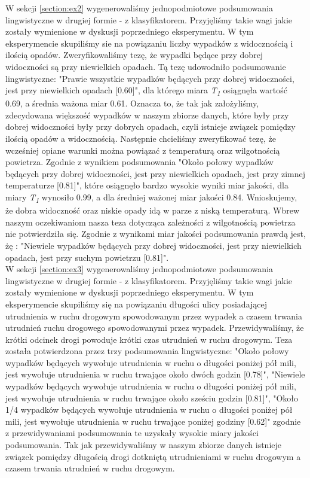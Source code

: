 \documentclass{classrep}
\begin{document}
W sekcji \ref{section:ex2} wygenerowaliśmy jednopodmiotowe podsumowania lingwistyczne w drugiej formie - z klasyfikatorem. Przyjęliśmy takie wagi jakie zostały wymienione w dyskusji poprzedniego eksperymentu. W tym eksperymencie skupiliśmy sie na powiązaniu liczby wypadków z widocznością i ilością opadów. Zweryfikowaliśmy tezę, że wypadki będące przy dobrej widoczności są przy niewielkich opadach. Tą tezę udowodniło podsumowanie lingwistyczne: "Prawie wszystkie wypadków będących przy dobrej widoczności, jest przy niewielkich opadach [0.60]", dla którego miara \textit{T\textsubscript{1}} osiągnęła wartość 0.69, a średnia ważona miar 0.61. Oznacza to, że tak jak założyliśmy, zdecydowana większość wypadków w naszym zbiorze danych, które były przy dobrej widoczności były przy dobrych opadach, czyli istnieje związek pomiędzy ilością opadów a widocznością. Następnie chcieliśmy zweryfikować tezę, że wcześniej opiane warunki można powiązać z temperaturą oraz wilgotnością powietrza. Zgodnie z wynikiem podsumowania "Około połowy wypadków będących przy dobrej widoczności, jest przy niewielkich opadach, jest przy zimnej temperaturze [0.81]", które osiągnęło bardzo wysokie wyniki miar jakości, dla miary \textit{T\textsubscript{1}} wynosiło 0.99, a dla średniej ważonej miar jakości 0.84. Wnioskujemy, że dobra widoczność oraz niskie opady idą w parze z niską temperaturą. Wbrew naszym oczekiwaniom nasza teza dotycząca zależności z wilgotnością powietrza nie potwierdziła się. Zgodnie z wynikami miar jakości podsumowania prawdą jest, żę : "Niewiele wypadków będących przy dobrej widoczności, jest przy niewielkich opadach, jest przy suchym powietrzu [0.81]". \\

W sekcji \ref{section:ex3} wygenerowaliśmy jednopodmiotowe podsumowania lingwistyczne w drugiej formie - z klasyfikatorem. Przyjęliśmy takie wagi jakie zostały wymienione w dyskusji poprzedniego eksperymentu. W tym eksperymencie skupiliśmy się na powiązaniu długości ulicy posiadającej utrudnienia w ruchu drogowym spowodowanym przez wypadek a czasem trwania utrudnień ruchu drogowego spowodowanymi przez wypadek. Przewidywaliśmy, że krótki odcinek drogi powoduje krótki czas utrudnień w ruchu drogowym. Teza została potwierdzona przez trzy podsumowania lingwistyczne: "Około połowy wypadków będących wywołuje utrudnienia w ruchu o długości poniżej pół mili, jest wywołuje utrudnienia w ruchu trwające około dwóch godzin [0.78]", "Niewiele wypadków będących wywołuje utrudnienia w ruchu o długości poniżej pół mili, jest wywołuje utrudnienia w ruchu trwające około sześciu godzin [0.81]", "Około 1/4 wypadków będących wywołuje utrudnienia w ruchu o długości poniżej pół mili, jest wywołuje utrudnienia w ruchu trwające poniżej godziny [0.62]" zgodnie z przewidywaniami podsumowania te uzyskały wysokie miary jakości podsumowania. Tak jak przewidywaliśmy w naszym zbiorze danych istnieje związek pomiędzy długością drogi dotkniętą utrudnieniami w ruchu drogowym a czasem trwania utrudnień w ruchu drogowym.
\end{document}
